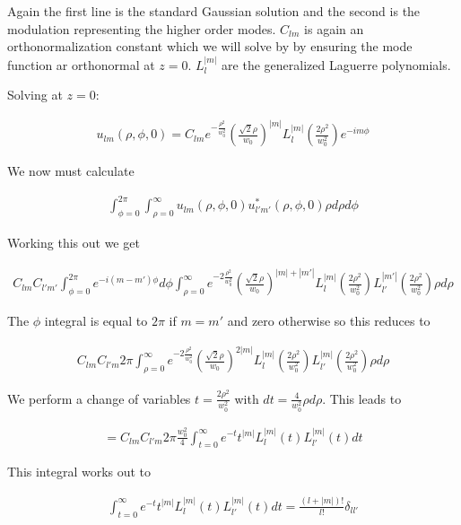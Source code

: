 \documentclass[12pt]{article}
\begin{document}
Again the first line is the standard Gaussian solution and the second is the modulation representing the higher order modes.
$C_{lm}$ is again an orthonormalization constant which we will solve by by ensuring the mode function ar orthonormal at $z=0$.
$L_l^{|m|}$ are the generalized Laguerre polynomials.

Solving at $z=0$:

\begin{align}
u_{lm}(\rho, \phi, 0) = C_{lm} e^{-\frac{\rho^2}{w_0^2}}\left(\frac{\sqrt{2}\rho}{w_0}\right)^{|m|}L_l^{|m|}\left(\frac{2\rho^2}{w_0^2}\right)e^{-im\phi}
\end{align}

We now must calculate

\begin{align}
\int_{\phi=0}^{2\pi} \int_{\rho=0}^{\infty} u_{lm}(\rho, \phi, 0) u_{l'm'}^*(\rho,\phi,0) \rho d\rho d\phi
\end{align}

Working this out we get

\begin{align}
C_{lm}C_{l'm'}\int_{\phi=0}^{2\pi} e^{-i(m-m')\phi} d\phi \int_{\rho=0}^{\infty} e^{-2\frac{\rho^2}{w_0^2}} \left(\frac{\sqrt{2}\rho}{w_0}\right)^{|m|+|m'|} L_l^{|m|}\left(\frac{2\rho^2}{w_0^2}\right)L_{l'}^{|m'|}\left(\frac{2\rho^2}{w_0^2}\right) \rho d\rho
\end{align}

The $\phi$ integral is equal to $2\pi$ if $m=m'$ and zero otherwise so this reduces to

\begin{align}
C_{lm}C_{l'm}2\pi \int_{\rho=0}^{\infty} e^{-2\frac{\rho^2}{w_0^2}}\left(\frac{\sqrt{2}\rho}{w_0}\right)^{2|m|} L_l^{|m|}\left(\frac{2\rho^2}{w_0^2}\right)L_{l'}^{|m|}\left(\frac{2\rho^2}{w_0^2}\right) \rho d\rho
\end{align}

We perform a change of variables $t = \frac{2\rho^2}{w_0^2}$ with $dt = \frac{4}{w_0^2} \rho d\rho$.
This leads to

\begin{align}
= C_{lm}C_{l'm} 2\pi \frac{w_0^2}{4} \int_{t=0}^{\infty} e^{-t} t^{|m|} L_l^{|m|}(t) L_{l'}^{|m|}(t) dt
\end{align}

This integral works out to

\begin{align}
\int_{t=0}^{\infty} e^{-t} t^{|m|} L_l^{|m|}(t) L_{l'}^{|m|}(t) dt = \frac{(l+|m|)!}{l!} \delta_{ll'}
\end{align}
\end{document}

